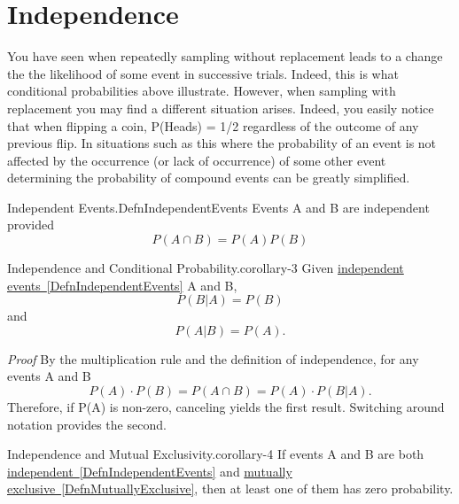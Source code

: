 \documentclass[10pt,]{book}
\makeatletter
\renewcommand*{\proofname}{Proof}
\renewenvironment{proof}[1][\proofname]{\par
  \pushQED{\qed}%
  \normalfont \topsep6\p@\@plus6\p@\relax
  \trivlist
  \item\relax
    {\itshape
    #1\@addpunct{.}}\hspace\labelsep\ignorespaces
}{%
  \popQED\endtrivlist\@endpefalse
}
\numberwithin{equation}{section}
\makeatother
\begin{document}
\section[{Independence}]{Independence}\label{section-29}
\hypertarget{p-590}{}%
You have seen when repeatedly sampling without replacement leads to a change the the likelihood of some event in successive trials. Indeed, this is what conditional probabilities above illustrate. However, when sampling with replacement you may find a different situation arises. Indeed, you easily notice that when flipping a coin, P(Heads) = 1/2 regardless of the outcome of any previous flip.  In situations such as this where the probability of an event is not affected by the occurrence (or lack of occurrence) of some other event determining the probability of compound events can be greatly simplified.%
\hypertarget{p-591}{}%
\begin{definition}{Independent Events.}{DefnIndependentEvents}%
\hypertarget{p-592}{}%
Events A and B are independent provided%
\begin{equation*}
P(A \cap B) = P(A) P(B)
\end{equation*}
%
\end{definition}
%
\par
\hypertarget{p-593}{}%
\begin{corollary}{Independence and Conditional Probability.}{}{corollary-3}%
\hypertarget{p-594}{}%
Given \hyperref[DefnIndependentEvents]{independent events~\ref{DefnIndependentEvents}} A and B,%
\begin{equation*}
P(B | A) = P(B)
\end{equation*}
and%
\begin{equation*}
P(A | B) = P(A).
\end{equation*}
%
\end{corollary}
\begin{proof}\hypertarget{proof-22}{}
\hypertarget{p-595}{}%
By the multiplication rule and the definition of independence, for any events A and B%
\begin{equation*}
P(A) \cdot P(B) = P(A \cap B) = P(A) \cdot P(B | A) .
\end{equation*}
Therefore, if P(A) is non-zero, canceling yields the first result. Switching around notation provides the second.%
\end{proof}
%
\par
\hypertarget{p-596}{}%
\begin{corollary}{Independence and Mutual Exclusivity.}{}{corollary-4}%
\hypertarget{p-597}{}%
If events A and B are both \hyperref[DefnIndependentEvents]{independent~\ref{DefnIndependentEvents}} and \hyperref[DefnMutuallyExclusive]{mutually exclusive~\ref{DefnMutuallyExclusive}}, then at least one of them has zero probability.%
\end{corollary}
\end{document}
